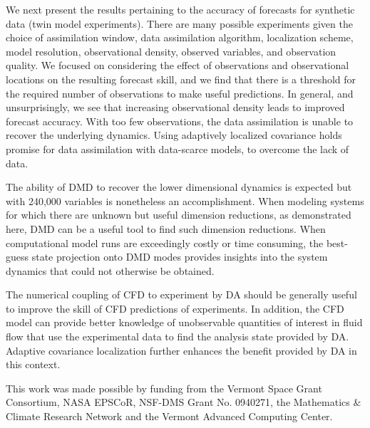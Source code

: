 \documentclass[pre,twocolumn,twoside,byrevtex,superscriptaddress]{revtex4}
\begin{document}
We next present the results pertaining to the accuracy of forecasts for synthetic data (twin model experiments).
There are many possible experiments given the choice of assimilation window, data assimilation algorithm, localization scheme, model resolution, observational density, observed variables, and observation quality.
We focused on considering the effect of observations and observational locations on the resulting forecast skill, and we find that there is a threshold for the required number of observations to make useful predictions.
In general, and unsurprisingly, we see that increasing observational density leads to improved forecast accuracy.
With too few observations, the data assimilation is unable to recover the underlying dynamics.
Using adaptively localized covariance holds promise for data assimilation with data-scarce models, to overcome the lack of data.

The ability of DMD to recover the lower dimensional dynamics is expected but with 240,000 variables is nonetheless an accomplishment.
When modeling systems for which there are unknown but useful dimension reductions, as demonstrated here, DMD can be a useful tool to find such dimension reductions.
When computational model runs are exceedingly costly or time consuming, the best-guess state projection onto DMD modes provides insights into the system dynamics that could not otherwise be obtained.

The numerical coupling of CFD to experiment by DA should be generally useful to improve the skill of CFD predictions of experiments.
In addition, the CFD model can provide better knowledge of unobservable quantities of interest in fluid flow that use the experimental data to find the analysis state provided by DA.
Adaptive covariance localization further enhances the benefit provided by DA in this context.

\begin{acknowledgements}
    This work was made possible by funding from the Vermont Space Grant Consortium, NASA EPSCoR, NSF-DMS Grant No. 0940271, the Mathematics \& Climate Research Network and the Vermont Advanced Computing Center.
\end{acknowledgements}
\end{document}
